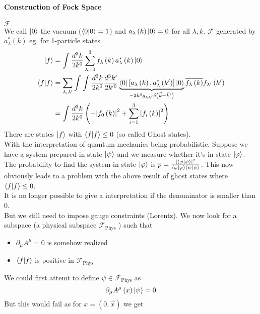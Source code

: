 \documentclass{report}
\begin{document}
\paragraph{Construction of Fock Space} $\mathcal{F} $\\
We call $\ket{0} $ the vacuum ($\bra{0} \ket{0} = 1 $) and $a_\lambda \left( k \right) \ket{0} = 0$ for all $\lambda, k$. $\mathcal{F} $ generated by $a_\lambda^{*} \left( k \right) $ eg. for 1-particle states
\begin{align*}
  \ket{f} &=  \int_{}^{} \frac{d^3 k}{2 k^{0} } \sum_{\lambda = 0 }^{3} f_\lambda \left( k \right) a_\lambda^{*}\left( k \right) \ket{0}     \\
  \bra{f} \ket{f} &= \sum_{\lambda, \lambda'}^{} \int_{}^{} \int_{}^{} \frac{d^3 k}{2 k^{0} } \frac{d^3 k'}{2 k'^{0} } \underbrace{\bra{0} \left[ a_\lambda\left( k \right) , a_\lambda^{*} \left( k' \right)  \right] \ket{0} }_{-2 k^{0} g_{\lambda \lambda'} \delta\left( \vec{k} - \vec{k}' \right) } \overline{f_\lambda\left( k \right) } f_{\lambda'} \left( k' \right)     \\
  &= \int_{}^{} \frac{d^3k}{2k^{0} } \left( - \abs{f_0 \left( k \right) } ^2 + \sum_{i=1}^{3} \abs{f_i\left( k \right) } ^2  \right)
\end{align*}
There are states $\ket{f} $ with $\bra{f} \ket{f} \le 0$ (so called Ghost states).\\
With the interpretation of quantum mechanics being probabilistic. Suppose we have a system prepared in state $\ket{\psi} $ and we measure whether it's in state $\ket{\varphi} $. The probability to find the system in state $\ket{\varphi} $ is $p = \frac{\abs{\bra{\varphi} \ket{\psi} } ^2}{\bra{\varphi} \ket{\varphi} \bra{\psi} \ket{\psi} }  $. This now obviously leads to a problem with the above result of ghost states where $\bra{f} \ket{f} \le 0$.\\
It is no longer possible to give a interpretation if the denominator is smaller than $0$.\\
But we still need to impose gauge constraints (Lorentz). We now look for a subspace (a physical subspace $\mathcal{F} _\text{Phys} $ ) such that
\begin{itemize}
  \item $\partial_\mu A^{\mu} = 0 $ is somehow realized
  \item $\bra{ f} \ket{f} $ is positive in $\mathcal{F} _\text{Phys} $
\end{itemize}
We could first attemt to define $\psi \in \mathcal{F} _\text{Phys} $ as \[
\partial_\mu A^{\mu} \left( x \right) \ket{\psi} =0 
\] But this would fail as for $x = \left( 0, \vec{x} \right) $ we get
\end{document}
